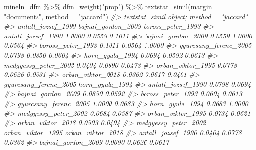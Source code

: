 \documentclass[
]{book}
\newenvironment{Shaded}{\begin{snugshade}}{\end{snugshade}}
\newcommand{\AttributeTok}[1]{\textcolor[rgb]{0.77,0.63,0.00}{#1}}
\newcommand{\CommentTok}[1]{\textcolor[rgb]{0.56,0.35,0.01}{\textit{#1}}}
\newcommand{\FunctionTok}[1]{\textcolor[rgb]{0.00,0.00,0.00}{#1}}
\newcommand{\NormalTok}[1]{#1}
\newcommand{\SpecialCharTok}[1]{\textcolor[rgb]{0.00,0.00,0.00}{#1}}
\newcommand{\StringTok}[1]{\textcolor[rgb]{0.31,0.60,0.02}{#1}}
\begin{document}
\begin{Shaded}
\begin{Highlighting}[]
\NormalTok{mineln\_dfm }\SpecialCharTok{\%\textgreater{}\%}
  \FunctionTok{dfm\_weight}\NormalTok{(}\StringTok{"prop"}\NormalTok{) }\SpecialCharTok{\%\textgreater{}\%}
  \FunctionTok{textstat\_simil}\NormalTok{(}\AttributeTok{margin =} \StringTok{"documents"}\NormalTok{, }\AttributeTok{method =} \StringTok{"jaccard"}\NormalTok{)}
\CommentTok{\#\textgreater{} textstat\_simil object; method = "jaccard"}
\CommentTok{\#\textgreater{}                       antall\_jozsef\_1990 bajnai\_gordon\_2009 boross\_peter\_1993}
\CommentTok{\#\textgreater{} antall\_jozsef\_1990                1.0000             0.0559            0.1011}
\CommentTok{\#\textgreater{} bajnai\_gordon\_2009                0.0559             1.0000            0.0564}
\CommentTok{\#\textgreater{} boross\_peter\_1993                 0.1011             0.0564            1.0000}
\CommentTok{\#\textgreater{} gyurcsany\_ferenc\_2005             0.0798             0.0850            0.0604}
\CommentTok{\#\textgreater{} horn\_gyula\_1994                   0.0694             0.0592            0.0613}
\CommentTok{\#\textgreater{} medgyessy\_peter\_2002              0.0404             0.0690            0.0473}
\CommentTok{\#\textgreater{} orban\_viktor\_1995                 0.0778             0.0626            0.0631}
\CommentTok{\#\textgreater{} orban\_viktor\_2018                 0.0362             0.0617            0.0401}
\CommentTok{\#\textgreater{}                       gyurcsany\_ferenc\_2005 horn\_gyula\_1994}
\CommentTok{\#\textgreater{} antall\_jozsef\_1990                   0.0798          0.0694}
\CommentTok{\#\textgreater{} bajnai\_gordon\_2009                   0.0850          0.0592}
\CommentTok{\#\textgreater{} boross\_peter\_1993                    0.0604          0.0613}
\CommentTok{\#\textgreater{} gyurcsany\_ferenc\_2005                1.0000          0.0683}
\CommentTok{\#\textgreater{} horn\_gyula\_1994                      0.0683          1.0000}
\CommentTok{\#\textgreater{} medgyessy\_peter\_2002                 0.0684          0.0587}
\CommentTok{\#\textgreater{} orban\_viktor\_1995                    0.0734          0.0621}
\CommentTok{\#\textgreater{} orban\_viktor\_2018                    0.0503          0.0494}
\CommentTok{\#\textgreater{}                       medgyessy\_peter\_2002 orban\_viktor\_1995 orban\_viktor\_2018}
\CommentTok{\#\textgreater{} antall\_jozsef\_1990                  0.0404            0.0778            0.0362}
\CommentTok{\#\textgreater{} bajnai\_gordon\_2009                  0.0690            0.0626            0.0617}

\end{Highlighting}
\end{Shaded}
\end{document}
